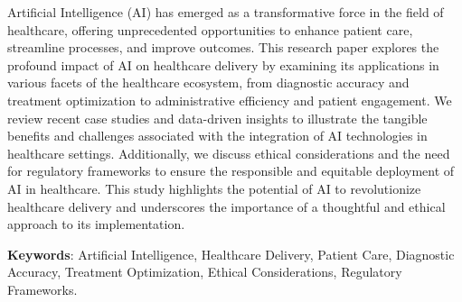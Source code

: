 {}
{}
Artificial Intelligence (AI) has emerged as a transformative force in the field of healthcare, offering unprecedented opportunities to enhance patient care, streamline processes, and improve outcomes. This research paper explores the profound impact of AI on healthcare delivery by examining its applications in various facets of the healthcare ecosystem, from diagnostic accuracy and treatment optimization to administrative efficiency and patient engagement. We review recent case studies and data-driven insights to illustrate the tangible benefits and challenges associated with the integration of AI technologies in healthcare settings. Additionally, we discuss ethical considerations and the need for regulatory frameworks to ensure the responsible and equitable deployment of AI in healthcare. This study highlights the potential of AI to revolutionize healthcare delivery and underscores the importance of a thoughtful and ethical approach to its implementation.

\textbf{Keywords}: Artificial Intelligence, Healthcare Delivery, Patient Care, Diagnostic Accuracy, Treatment Optimization, Ethical Considerations, Regulatory Frameworks.
